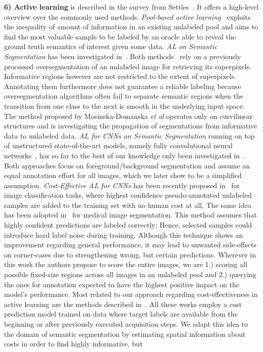 \documentclass{bmvc2k}
\def\etal{\emph{et al}\bmvaOneDot}
\begin{document}
{\bf6) Active learning} is described in the survey from Settles~\cite{settles2009active}. It offers a high-level overview over the commonly used methods. \textit{Pool-based active learning}~\cite{DBLP:journals/sigir/Lewis95a} exploits the inequality of amount of information in an existing unlabeled pool and aims to find the most valuable sample to be labeled by an oracle able to reveal the ground truth semantics of interest given some data. {\it AL on Semantic Segmentation} has been investigated in~\cite{DBLP:conf/cvpr/VezhnevetsBF12, DBLP:conf/iccv/KonyushkovaSF15, DBLP:conf/cvpr/Mosinska-Domanska16, DBLP:conf/cvpr/JainG16}. Both methods~\cite{DBLP:conf/cvpr/VezhnevetsBF12, DBLP:conf/iccv/KonyushkovaSF15} rely on a previously processed oversegmentation of an unlabeled image for retrieving its superpixels. Informative regions however are not restricted to the extent of superpixels. Annotating them furthermore does not guarantee a reliable labeling because oversegmentation algorithms often fail to separate semantic regions when the transition from one class to the next is smooth in the underlying input space. The method proposed by Mosinska-Domanska \etal\cite{DBLP:conf/cvpr/Mosinska-Domanska16} operates only on curvilinear structures and \cite{DBLP:conf/cvpr/JainG16} is investigating the propagation of segmentations from informative data to unlabeled data. {\it AL for CNNs on Semantic Segmentation} running on top of unstructured state-of-the-art models, namely fully convolutional neural networks~\cite{DBLP:conf/cvpr/LongSD15}, has so far to the best of our knowledge only been investigated in~\cite{DBLP:conf/miccai/YangZCZC17,DBLP:journals/corr/abs-1711-09168}. Both approaches focus on foreground/background segmentation and assume an equal annotation effort for all images, which we later show to be a simplified assumption. {\it Cost-Effective AL for CNNs} has been recently proposed in~\cite{DBLP:journals/tcsv/WangZLZL17} for image classification tasks, where highest confidence pseudo-annotated unlabeled samples are added to the training set with no human cost at all. The same idea has been adopted in~\cite{DBLP:journals/corr/abs-1711-09168} for medical image segmentation. This method assumes that highly confident predictions are labeled correctly; Hence, selected samples could introduce hard label noise during training. Although this technique shows an improvement regarding general performance, it may lead to unwanted side-effects on corner-cases due to strengthening wrong, but certain predictions. Wherever in this work the authors propose to score the entire images, we are 1.) scoring all possible fixed-size regions across all images in an unlabeled pool and 2.) querying the ones for annotation expected to have the highest positive impact on the model's performance. Most related to our approach regarding cost-effectiveness in active learning are the methods described in~\cite{Settles_activelearning, DBLP:conf/cvpr/VijayanarasimhanG09, DBLP:conf/icml/KrishnamurthyAH17}. All these works employ a cost prediction model trained on data where target labels are available from the beginning or after previously executed acquisition steps. We adapt this idea to the domain of semantic segmentation by estimating spatial information about costs in order to find highly informative, but 
\end{document}
